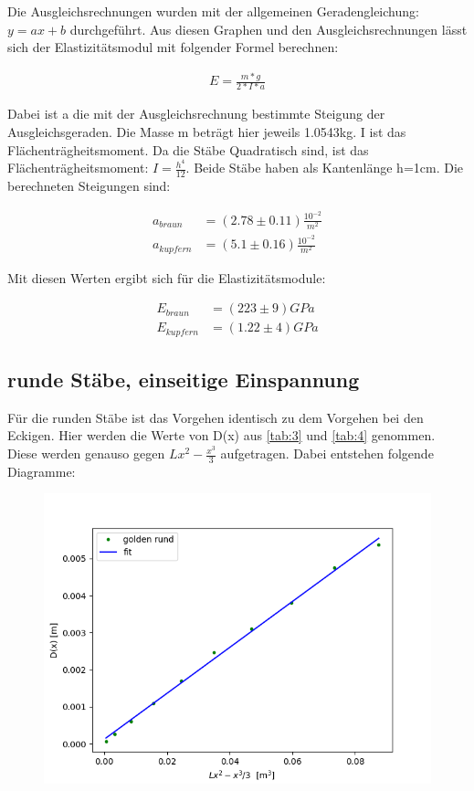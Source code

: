 \noindent Die Ausgleichsrechnungen wurden mit der allgemeinen Geradengleichung: $y = ax+b$ durchgeführt.
Aus diesen Graphen und den Ausgleichsrechnungen lässt sich der Elastizitätsmodul mit folgender Formel berechnen:

\begin{align*}
    E = \frac{m*g}{2*I*a}
\end{align*}

\noindent Dabei ist a die mit der Ausgleichsrechnung bestimmte Steigung der Ausgleichsgeraden. Die Masse m beträgt hier jeweils 1.0543kg.
I ist das Flächenträgheitsmoment. Da die Stäbe Quadratisch sind, ist das Flächenträgheitsmoment: $I=\frac{h^4}{12}$.
Beide Stäbe haben als Kantenlänge h=1cm. Die berechneten Steigungen sind:

\begin{align*}
    a_{braun} &= (2.78\pm 0.11) \frac{10^{-2}}{m^2}\\
    a_{kupfern} &= (5.1\pm 0.16) \frac{10^{-2}}{m^2} 
\end{align*}

\noindent Mit diesen Werten ergibt sich für die Elastizitätsmodule:

\begin{align*}
    E_{braun} &= (223\pm 9) GPa \\
    E_{kupfern} &= (1.22\pm 4) GPa
\end{align*}

\subsection{runde Stäbe, einseitige Einspannung}

Für die runden Stäbe ist das Vorgehen identisch zu dem Vorgehen bei den Eckigen. Hier werden die Werte von D(x) aus \ref{tab:3} und \ref{tab:4} genommen. Diese werden genauso gegen $Lx^2-\frac{x^3}{3}$ aufgetragen. Dabei entstehen folgende Diagramme:

\begin{figure}[H]
    \centering
    \includegraphics{gre.png}
\end{figure}

